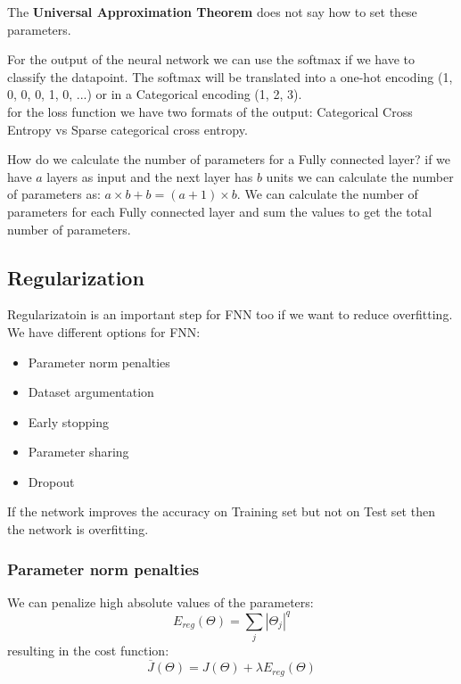 The \textbf{Universal Approximation Theorem} does not say how to set these parameters.

For the output of the neural network we can use the softmax if we have to classify the datapoint. The softmax will be translated into a one-hot encoding ({1, 0, 0}, {0, 1, 0}, ...) or in a Categorical encoding ({1, 2, 3}).\\
for the loss function we have two formats of the output: Categorical Cross Entropy vs Sparse categorical cross entropy.

How do we calculate the number of parameters for a Fully connected layer?
if we have $a$ layers as input and the next layer has $b$ units we can calculate the number of parameters as: $a \times b + b = (a + 1) \times b$. We can calculate the number of parameters for each Fully connected layer and sum the values to get the total number of parameters.



\subsection{Regularization}
Regularizatoin is an important step for FNN too if we want to reduce overfitting.\\
We have different options for FNN:
\begin{itemize}
    \item Parameter norm penalties
    \item Dataset argumentation
    \item Early stopping
    \item Parameter sharing
    \item Dropout
\end{itemize}

If the network improves the accuracy on Training set but not on Test set then the network is overfitting.

\subsubsection{Parameter norm penalties}
We can penalize high absolute values of the parameters:
\begin{equation}
    E_{reg}(\Theta) = \sum_{j} |\Theta_{j}|^{q}
\end{equation}
resulting in the cost function:
\begin{equation}
    \overline{J}(\Theta) = J(\Theta) + \lambda E_{reg}(\Theta)
\end{equation}

